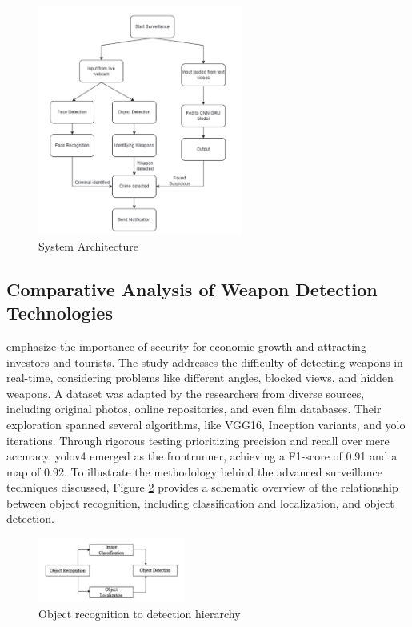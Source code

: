 \begin{figure}[h]
    \centering 
    \includegraphics[width=0.6\textwidth]{figs/shenoy-architecture.png} 
    \caption{\citet{rfc7} System Architecture}
    \label{fig:shenoy-architecture}
\end{figure}

\subsection{Comparative Analysis of Weapon Detection Technologies}
\citet{rfc4} emphasize the importance of security for economic growth and attracting investors and tourists. The study addresses the difficulty of detecting weapons in real-time, considering problems like different angles, blocked views, and hidden weapons. A dataset was adapted by the researchers from diverse sources, including original photos, online repositories, and even film databases. Their exploration spanned several algorithms, like VGG16, Inception variants, and \ac{yolo} iterations. Through rigorous testing prioritizing precision and recall over mere accuracy, \ac{yolo}v4 emerged as the frontrunner, achieving a F1-score of 0.91 and a \ac{map} of 0.92. To illustrate the methodology behind the advanced surveillance techniques discussed, Figure \ref{fig:bhatti-chart} provides a schematic overview of the relationship between object recognition, including classification and localization, and object detection.

\begin{figure}[ht]
    \centering 
    \includegraphics[width=0.43\textwidth]{figs/bhatti-chart.png} 
    \caption{Object recognition to detection hierarchy \cite{rfc4}}
    \label{fig:bhatti-chart}
\end{figure}

